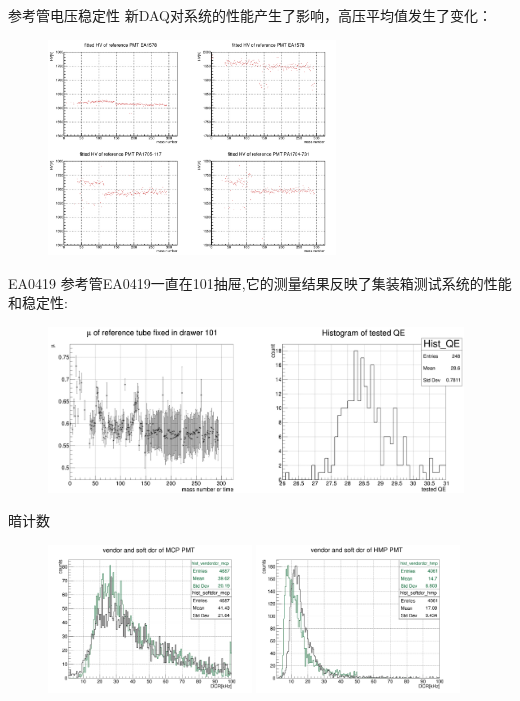 \documentclass[11pt,compress,xcolor=x11names,UTF8]{beamer}
\begin{document}
\begin{frame}{参考管电压稳定性}
新DAQ对系统的性能产生了影响，高压平均值发生了变化：
\begin{figure}
\centering
\includegraphics[width=0.68\textwidth]{ref_HV_sta}
\end{figure}
\end{frame}
\begin{frame}{EA0419}
参考管EA0419一直在101抽屉,它的测量结果反映了集装箱测试系统的性能和稳定性:
\begin{figure}
\centering
\includegraphics[width=0.98\textwidth]{101_sta}
\end{figure}
\end{frame}
\begin{frame}{暗计数}
\begin{figure}
\centering
\includegraphics[width=0.48\textwidth]{vendordcr_mcp}
\includegraphics[width=0.48\textwidth]{vendordcr_hmp}
\end{figure}
\end{frame}
\end{document}
